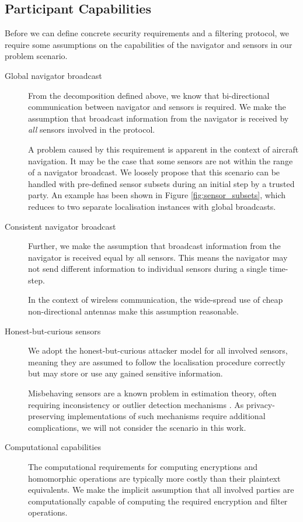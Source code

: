 \documentclass[twocolumn]{autart}
\begin{document}
\subsection{Participant Capabilities} \label{subsec:capabilities}
Before we can define concrete security requirements and a filtering protocol, we require some assumptions on the capabilities of the navigator and sensors in our problem scenario.
\begin{description}
    \item[Global navigator broadcast] From the decomposition defined above, we know that bi-directional communication between navigator and sensors is required. We make the assumption that broadcast information from the navigator is received by \textit{all} sensors involved in the protocol.
    
    A problem caused by this requirement is apparent in the context of aircraft navigation. It may be the case that some sensors are not within the range of a navigator broadcast. We loosely propose that this scenario can be handled with pre-defined sensor subsets during an initial step by a trusted party. An example has been shown in Figure \ref{fig:sensor_subsets}, which reduces to two separate localisation instances with global broadcasts.
    \item[Consistent navigator broadcast] Further, we make the assumption that broadcast information from the navigator is received equal by all sensors. This means the navigator may not send different information to individual sensors during a single time-step.
    
    In the context of wireless communication, the wide-spread use of cheap non-directional antennas make this assumption reasonable.
    \item[Honest-but-curious sensors] We adopt the honest-but-curious attacker model for all involved sensors, meaning they are assumed to follow the localisation procedure correctly but may store or use any gained sensitive information. 
    
    Misbehaving sensors are a known problem in estimation theory, often requiring inconsistency or outlier detection mechanisms \cite{lazosSeRLocSecureRangeindependent2004,ben-galOutlierDetection2005}. As privacy-preserving implementations of such mechanisms require additional complications, we will not consider the scenario in this work.
    \item[Computational capabilities] The computational requirements for computing encryptions and homomorphic operations are typically more costly than their plaintext equivalents. We make the implicit assumption that all involved parties are computationally capable of computing the required encryption and filter operations.
\end{description}
\end{document}
